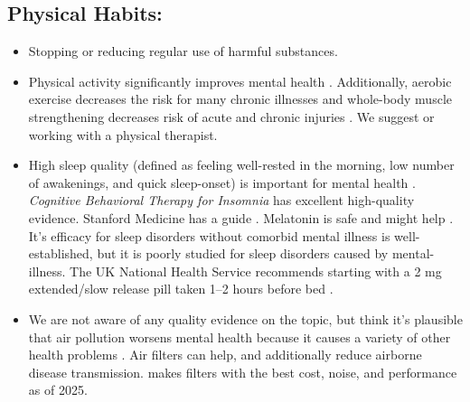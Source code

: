 \documentclass[12pt,letterpaper]{book}
\begin{document}
\subsection*{Physical Habits:}
\begin{itemize}
   \item Stopping or reducing regular use of harmful substances.
   \item Physical activity significantly improves mental health \cite{activityMetaAnalysis}. Additionally, aerobic exercise decreases the risk for many chronic illnesses \cite{liebermanExercised} and whole-body muscle strengthening decreases risk of acute and chronic injuries \cite{lauersenStrength}. We suggest \textcite{lowBodyweight} or working with a physical therapist.
   \item High sleep quality (defined as feeling well-rested in the morning, low number of awakenings, and quick sleep-onset) is important for  mental health \cite{scottSleep}. \textit{Cognitive Behavioral Therapy for Insomnia} has excellent high-quality evidence. Stanford Medicine has a guide \cite{stanfordSleep}. Melatonin is safe and might help \cite{moon2022role}. It's efficacy for sleep disorders without comorbid mental illness is well-established, but it is poorly studied for sleep disorders caused by mental-illness. The UK National Health Service recommends starting with a 2 mg extended/slow release pill taken 1–2 hours before bed \cite{nhsMelatonin}.
   \item We are not aware of any quality evidence on the topic, but think it's plausible that air pollution worsens mental health because it causes a variety of other health problems \cite{airPollution}. Air filters can help, and additionally reduce airborne disease transmission. \textcite{cleanAir} makes filters with the best cost, noise, and performance as of 2025.
\end{itemize}
\end{document}

